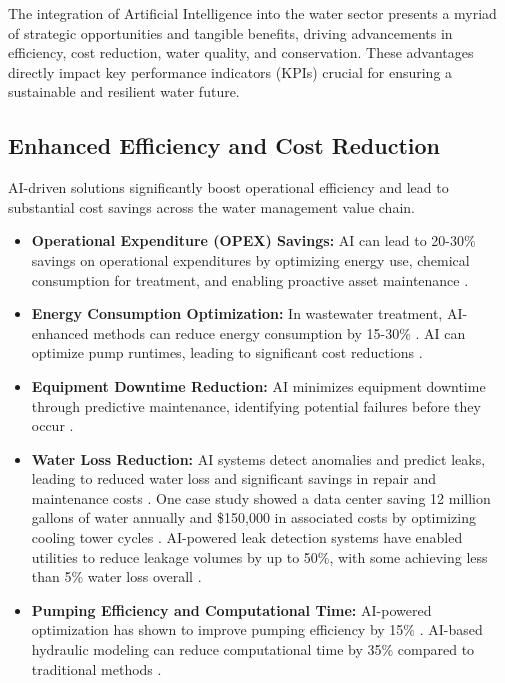 The integration of Artificial Intelligence into the water sector presents a myriad of strategic opportunities and tangible benefits, driving advancements in efficiency, cost reduction, water quality, and conservation. These advantages directly impact key performance indicators (KPIs) crucial for ensuring a sustainable and resilient water future.

\subsection{Enhanced Efficiency and Cost Reduction}
AI-driven solutions significantly boost operational efficiency and lead to substantial cost savings across the water management value chain.
\begin{itemize}
    \item \textbf{Operational Expenditure (OPEX) Savings:} AI can lead to 20-30\% savings on operational expenditures by optimizing energy use, chemical consumption for treatment, and enabling proactive asset maintenance \cite{DLT_Benefits}.
    \item \textbf{Energy Consumption Optimization:} In wastewater treatment, AI-enhanced methods can reduce energy consumption by 15-30\% \cite{SustainabilityLinkedIn_Benefits}. AI can optimize pump runtimes, leading to significant cost reductions \cite{DLT_Benefits}.
    \item \textbf{Equipment Downtime Reduction:} AI minimizes equipment downtime through predictive maintenance, identifying potential failures before they occur \cite{WhiteCase_Benefits, AISmartUp_Benefits}.
    \item \textbf{Water Loss Reduction:} AI systems detect anomalies and predict leaks, leading to reduced water loss and significant savings in repair and maintenance costs \cite{EFCNetwork_Benefits}. One case study showed a data center saving 12 million gallons of water annually and \$150,000 in associated costs by optimizing cooling tower cycles \cite{WaterTechnologies_Benefits}. AI-powered leak detection systems have enabled utilities to reduce leakage volumes by up to 50\%, with some achieving less than 5\% water loss overall \cite{SE_Benefits, H2OGlobalNews_Benefits}. 
    \item \textbf{Pumping Efficiency and Computational Time:} AI-powered optimization has shown to improve pumping efficiency by 15\% \cite{MDPI_Benefits}. AI-based hydraulic modeling can reduce computational time by 35\% compared to traditional methods \cite{MDPI_Benefits}.
\end{itemize}

